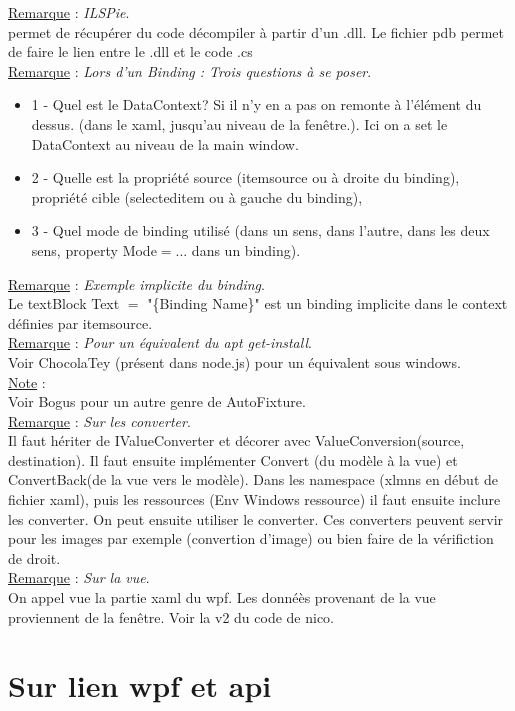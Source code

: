 \documentclass[a4paper,12pt,twoside]{article}
\newcommand{\rem}[2]{\noindent\underline{Remarque} : \textit{#1}.\\ \indent #2}
\newcommand{\note}[1]{\noindent\underline{Note} : \\ \indent #1}
\begin{document}
\rem{ILSPie}{permet de récupérer du code décompiler à partir d'un .dll. Le fichier pdb permet de faire le lien entre le .dll et le code .cs}\\

\rem{Lors d'un Binding : Trois questions à se poser}{\begin{itemize}
\item 1 - Quel est le DataContext? Si il n'y en a pas on remonte à l'élément du dessus. (dans le xaml, jusqu'au niveau de la fenêtre.). Ici on a set le DataContext au niveau de la main window.
\item 2 - Quelle est la propriété source (itemsource ou à droite du binding), propriété cible (selecteditem ou à gauche du binding),
\item 3 - Quel mode de binding utilisé (dans un sens, dans l'autre, dans les deux sens, property Mode$=$... dans un binding).\\
\end{itemize}}

\rem{Exemple implicite du binding}{Le textBlock Text $=$ "\{Binding Name\}" est un binding implicite dans le context définies par itemsource}.\\

\rem{Pour un équivalent du apt get-install}{Voir ChocolaTey (présent dans node.js) pour un équivalent sous windows.}\\

\note{Voir Bogus pour un autre genre de AutoFixture.}\\

\rem{Sur les converter}{Il faut hériter de IValueConverter et décorer avec ValueConversion(source, destination). Il faut ensuite implémenter Convert (du modèle à la vue) et ConvertBack(de la vue vers le modèle). Dans les namespace (xlmns en début de fichier xaml), puis les ressources (Env Windows ressource) il faut ensuite inclure les converter. On peut ensuite utiliser le converter. Ces converters peuvent servir pour les images par exemple (convertion d'image) ou bien faire de la vérifiction de droit.}\\

\rem{Sur la vue}{On appel vue la partie xaml du wpf. Les donnéès provenant de la vue proviennent de la fenêtre. Voir la v2 du code de nico.}\\


\section{Sur lien wpf et api}
\end{document}
